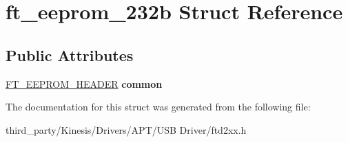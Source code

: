 \hypertarget{structft__eeprom__232b}{}\section{ft\+\_\+eeprom\+\_\+232b Struct Reference}
\label{structft__eeprom__232b}
\subsection*{Public Attributes}
\begin{DoxyCompactItemize}
\item 
\hyperlink{structft__eeprom__header}{F\+T\+\_\+\+E\+E\+P\+R\+O\+M\+\_\+\+H\+E\+A\+D\+ER} {\bfseries common}\hypertarget{structft__eeprom__232b_ad20111a2bbd898f3e5e8e0f780e8d7cf}{}\label{structft__eeprom__232b_ad20111a2bbd898f3e5e8e0f780e8d7cf}

\end{DoxyCompactItemize}


The documentation for this struct was generated from the following file\+:\begin{DoxyCompactItemize}
\item 
third\+\_\+party/\+Kinesis/\+Drivers/\+A\+P\+T/\+U\+S\+B Driver/ftd2xx.\+h\end{DoxyCompactItemize}

